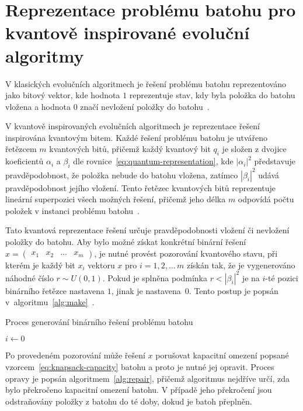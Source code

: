 \section{Reprezentace problému batohu pro kvantově inspirované evoluční algoritmy}
V klasických evolučních algoritmech je řešení problému batohu reprezentováno jako bitový vektor, kde hodnota $1$ reprezentuje stav, kdy byla položka do batohu vložena a hodnota $0$ značí nevložení položky do batohu~\cite{qiga}.

V kvantově inspirovaných evolučních algoritmech je reprezentace řešení inspirována kvantovým bitem. 
Každé řešení problému batohu je utvářeno řetězcem $m$ kvantových bitů, přičemž každý kvantový bit $q_i$ je složen z dvojice koeficientů $\alpha_i$ a $\beta_i$ dle rovnice~\ref{eq:quantum-representation}, kde $\left| \alpha_i \right|^2$ představuje pravděpodobnost, že položka nebude do batohu vložena, zatímco $\left| \beta_i \right|^2$ udává pravděpodobnost jejího vložení. 
Tento řetězec kvantových bitů reprezentuje lineární superpozici všech možných řešení, přičemž jeho délka $m$ odpovídá počtu položek v instanci problému batohu~\cite{qiga}.

Tato kvantová reprezentace řešení určuje pravděpodobnosti vložení či nevložení položky do batohu. 
Aby bylo možné získat konkrétní binární řešení $x = \begin{pmatrix} x_1 & x_2 & \dots & x_m \end{pmatrix}$, je nutné provést pozorování kvantového stavu, při kterém je každý bit $x_i$ vektoru $x$ pro $i = 1,2,\dots\,m$ získán tak, že je vygenerováno náhodné číslo $r \sim U\left(0,1\right)$. 
Pokud je splněna podmínka $r < \left| \beta_i \right|^2$ je na $i$-té pozici binárního řetězce nastavena $1$, jinak je nastavena~$0$. 
Tento postup je popsán v~algoritmu~\ref{alg:make}~\cite{qiga}.

\begin{algorithm}[H]
    \caption{Proces generování binárního řešení problému batohu~\cite{qiga}}
    \label{alg:make}
    $i \gets 0$\;
\end{algorithm}

Po provedeném pozorování může řešení $x$ porušovat kapacitní omezení popsané vzorcem~\ref{eq:knapsack-capacity} batohu a proto je nutné jej opravit. 
Proces opravy je popsán algoritmem~\ref{alg:repair}, přičemž algoritmus nejdříve určí, zda bylo překročeno kapacitní omezení batohu. 
V případě jeho překročení jsou odstraňovány položky z batohu do té doby, dokud je batoh přeplněn. 

